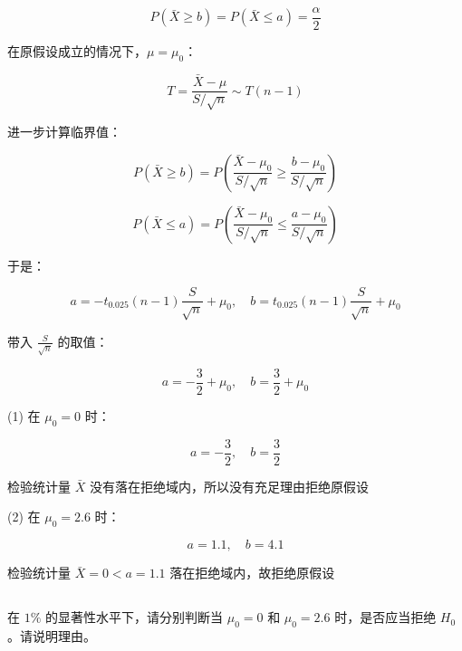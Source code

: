 \documentclass[12pt,a4paper]{article}
\begin{document}
\begin{answerbox}
$$
P\left(\bar{X} \geq b\right) = P\left(\bar{X} \leq a\right) = \frac{\alpha}{2} 
$$

在原假设成立的情况下，$\mu = \mu_0$：

$$
T = \frac{\bar{X}-\mu}{S/\sqrt{n}} \sim T(n-1)
$$

进一步计算临界值：

$$
P\left(\bar{X} \geq b\right) = P\left(\frac{\bar{X} - \mu_0}{S / \sqrt{n}}\geq \frac{b - \mu_0}{S / \sqrt{n}} \right)
$$

$$
P\left(\bar{X} \leq a\right) = P\left(\frac{\bar{X} - \mu_0}{S / \sqrt{n}}\leq \frac{a - \mu_0}{S / \sqrt{n}} \right)
$$

于是：

$$
a = -t_{0.025}(n-1)\frac{S}{\sqrt{n}} + \mu_0, \quad b = t_{0.025}(n-1)\frac{S}{\sqrt{n}} + \mu_0
$$

带入 $\frac{S}{\sqrt{n}}$ 的取值：

$$
a = -\frac{3}{2} + \mu_0, \quad b = \frac{3}{2} + \mu_0
$$

(1) 在 $\mu_0 = 0$ 时：

$$
a = -\frac{3}{2}, \quad b = \frac{3}{2}
$$

检验统计量 $\bar{X}$ 没有落在拒绝域内，所以没有充足理由拒绝原假设

(2) 在 $\mu_0 = 2.6$ 时：

$$
a = 1.1, \quad b = 4.1
$$

检验统计量 $\bar{X} = 0 < a = 1.1$ 落在拒绝域内，故拒绝原假设

\end{answerbox}

\subsection{}

在 $1\%$ 的显著性水平下，请分别判断当 $\mu_0=0$ 和 $\mu_0=2.6$ 时，是否应当拒绝 $H_0$。请说明理由。
\end{document}
